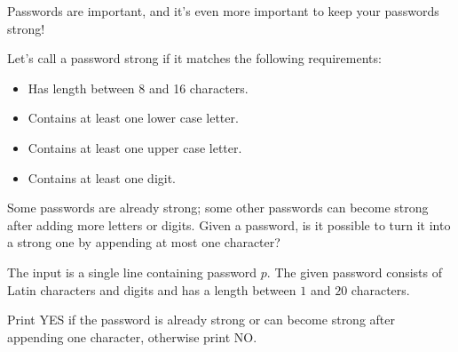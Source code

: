 \problemname{\problemyamlname}


\newcommand{\minlen}{1}
\newcommand{\maxlen}{20}

Passwords are important, and it's even more important to keep your passwords strong!

Let's call a password strong if it matches the following requirements:
\begin{itemize}
\item Has length between 8 and 16 characters.
\item Contains at least one lower case letter.
\item Contains at least one upper case letter.
\item Contains at least one digit.
\end{itemize}

Some passwords are already strong; some other passwords can become strong after adding more letters or digits.
Given a password, is it possible to turn it into a strong one by appending at most one character?

\begin{Input}
    The input is a single line containing password $p$. The given password consists of Latin characters and digits and has a length between $\minlen$ and $\maxlen$ characters.
\end{Input}

\begin{Output}
    Print YES if the password is already strong or can become strong after appending one character, otherwise print NO.
\end{Output}
